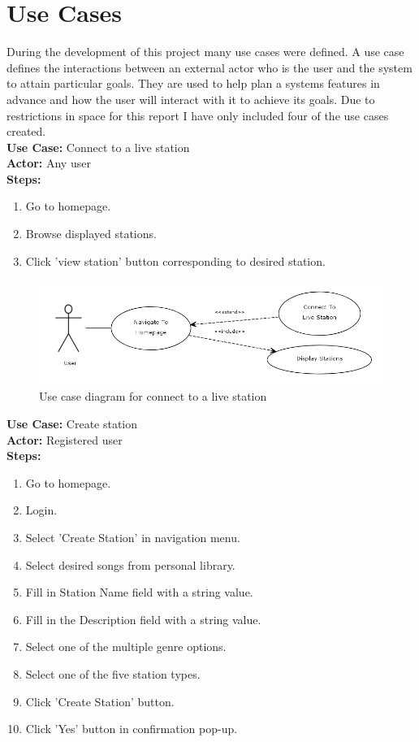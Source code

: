 \documentclass[a4paper, 12pt]{report}
\begin{document}
\section{Use Cases}
During the development of this project many use cases were defined. A use case defines the interactions between an external actor who is the user and the system to attain particular goals. They are used to help plan a systems features in advance and how the user will interact with it to achieve its goals.
Due to restrictions in space for this report I have only included four of the use cases created.\\ 
\textbf{Use Case:} Connect to a live station\\
\textbf{Actor:} Any user\\
\textbf{Steps:}
\begin{enumerate}
\item Go to homepage.
\item Browse displayed stations.
\item Click 'view station' button corresponding to desired station.
\end{enumerate}
\begin{figure}[!htbp]
  \centering
    \includegraphics[width=1.0\textwidth]{usecase1.png}
    \caption{Use case diagram for connect to a live station}
\end{figure}
\textbf{Use Case:} Create station\\
\textbf{Actor:} Registered user\\
\textbf{Steps:} 
\begin{enumerate}
\item Go to homepage.
\item Login.
\item Select 'Create Station' in navigation menu.
\item Select desired songs from personal library.
\item Fill in Station Name field with a string value.
\item Fill in the Description field with a string value.
\item Select one of the multiple genre options.
\item Select one of the five station types.
\item Click 'Create Station' button.
\item Click 'Yes' button in confirmation pop-up.
\end{enumerate}
\end{document}
